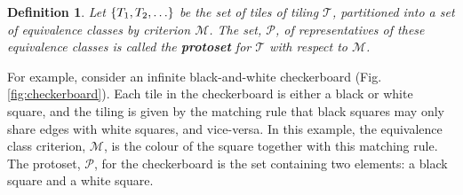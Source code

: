 \documentclass[
  oneside,
  11pt, a4paper,
  footinclude=true,
  headinclude=true,
  cleardoublepage=empty
]{scrbook}
\newtheorem{mydef}{Definition}
\begin{document}
\begin{mydef}
Let $\{T_1,T_2,\mathellipsis\}$ be the set of tiles of tiling $\mathcal{T}$, partitioned into a set of equivalence classes by criterion $\mathcal{M}$. The set, $\mathcal{P}$, of representatives of these equivalence classes is called the \textbf{protoset} for $\mathcal{T}$ with respect to $\mathcal{M}$.
\end{mydef}

For example, consider an infinite black-and-white checkerboard (Fig.\ref{fig:checkerboard}). Each tile in the checkerboard is either a black or white square, and the tiling is given by the matching rule that black squares may only share edges with white squares, and vice-versa. In this example, the equivalence class criterion, $\mathcal{M}$, is the colour of the square together with this matching rule. The protoset, $\mathcal{P}$, for the checkerboard is the set containing two elements: a black square and a white square.
\end{document}
